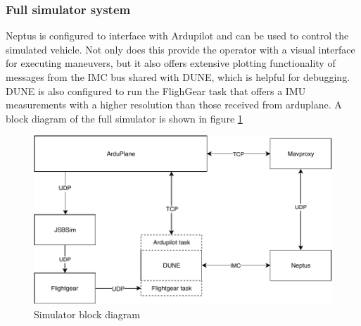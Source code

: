     \subsubsection{Full simulator system}
        Neptus is configured to interface with Ardupilot and can be used to control the simulated vehicle. Not only does this provide the operator with a visual interface for executing maneuvers, but it also offers extensive plotting functionality of messages from the IMC bus shared with DUNE, which is helpful for debugging. DUNE is also configured to run the FlighGear task that offers a IMU measurements with a higher resolution than those received from arduplane. A block diagram of the full simulator is shown in figure \ref{fig:sim-diag}
        
        \begin{figure}
            \centering
            \includegraphics[scale=0.8]{Images/Simulator.pdf}
            \caption{Simulator block diagram}
            \label{fig:sim-diag}
        \end{figure}
        

